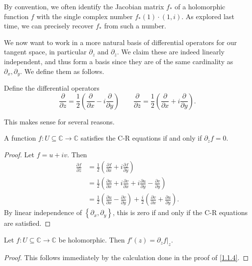 
By convention, we often identify the Jacobian matrix $f_*$ of a holomorphic function $f$ with the single complex number $f_*(1)\cdot (1,i)$. As explored last time, we can precisely recover $f_*$ from such a number.

We now want to work in a more natural basis of differential operators for our tangent space, in particular $\partial _z$ and $\partial _{\overline{z} } $. We claim these are indeed linearly independent, and thus form a basis since they are of the same cardinality as $\partial _x,\partial_y$. We define them as follows.
\begin{definition}\label{1.1.3}
	Define the differential operators
	\[
		\frac{\partial }{\partial z} =\frac{1}{2} \left( \frac{\partial }{\partial x} -i\frac{\partial }{\partial y}  \right) \qquad \frac{\partial }{\partial \overline{z} } =\frac{1}{2} \left( \frac{\partial }{\partial x}+i \frac{\partial }{\partial y}  \right) 
	.\]
\end{definition}

This makes sense for several reasons.

\begin{proposition}\label{1.1.4}
	A function $f : U\subseteq \mathbb{C}  \to \mathbb{C} $ satisfies the C-R equations if and only if $\partial _{\overline{z} } f=0$.
\end{proposition}
\begin{proof}
	Let $f=u+iv$. Then
	\begin{align*}
		\frac{\partial f}{\partial \overline{z} } &=\frac{1}{2} \left( \frac{\partial f}{\partial x} +i \frac{\partial f}{\partial y}  \right) \\
							  &=\frac{1}{2} \left( \frac{\partial u}{\partial x} +i \frac{\partial v}{\partial x} +i \frac{\partial u}{\partial y} -\frac{\partial v}{\partial y}  \right) \\
							  &=\frac{1}{2} \left( \frac{\partial u}{\partial x} -\frac{\partial v}{\partial y}  \right) +\frac{i}{2} \left( \frac{\partial v}{\partial x} +\frac{\partial u}{\partial y}  \right) 
	.\end{align*}
	By linear independence of $\left\{ \partial _x,\partial _y \right\} $, this is zero if and only if the C-R equations are satisfied.
\end{proof}
\begin{proposition}\label{1.1.5}
	Let $f : U\subseteq \mathbb{C}  \to \mathbb{C} $ be holomorphic. Then $f'(z)=\partial_zf|_z$.
\end{proposition}
\begin{proof}
	This follows immediately by the calculation done in the proof of \cref{1.1.4}.
\end{proof}

